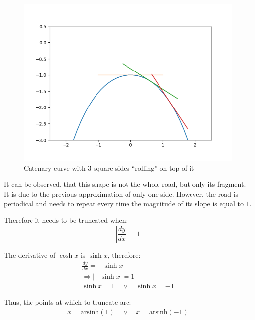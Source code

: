 \documentclass[12pt]{article}
\begin{document}
        \begin{figure}[H]
            \centering
            \includegraphics[width=0.8\linewidth]{images/cosh_many.png}
            \caption[Catenary curve with 3 square sides]{Catenary curve with 3 square sides ``rolling'' on top of it\footnotemark}\label{fig:cosh}
        \end{figure}

        It can be observed, that this shape is not the whole road, but only its fragment. It is due to the previous approximation of only one side. However, the road is periodical and needs to repeat every time the magnitude of its slope is equal to $1$\cite{Hall_Wagon_1992}. %

        Therefore it needs to be truncated when:
        \begin{equation}
            | \frac{dy}{dx} | = 1
        \end{equation}

        The derivative of $\cosh x$ is $\sinh x$, therefore:
        \begin{align*}
            \frac{dy}{dx} = - \sinh x \\
            \Rightarrow | - \sinh x | = 1 \\
            \sinh x = 1 \quad\lor\quad \sinh x = -1
        \end{align*}

        Thus, the points at which to truncate are:
        \begin{align}\label{eq:x_cosh_end}
            x = \text{arsinh}(1) \quad\lor\quad x = \text{arsinh}(-1)
        \end{align}
\end{document}
